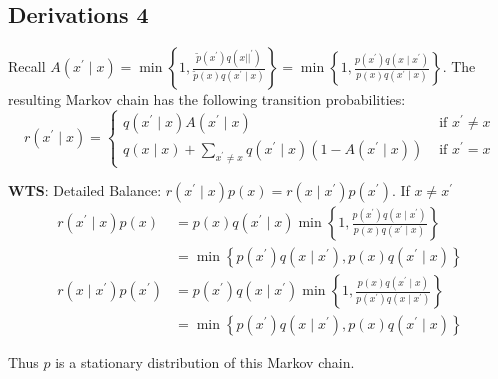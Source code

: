 \subsection{Derivations 4}
\label{sec:proof-metro}
Recall $A\left(x^{\prime} \mid x\right)=\min \left\{1, \frac{\tilde{p}\left(x^{\prime}\right) q\left(x||^{\prime}\right)}{\tilde{p}(x) q\left(x^{\prime} \mid x\right)}\right\}=\min \left\{1, \frac{p\left(x^{\prime}\right) q\left(x \mid x^{\prime}\right)}{p(x) q\left(x^{\prime} \mid x\right)}\right\}$.
The resulting Markov chain has the following transition probabilities:
$$
r\left(x^{\prime} \mid x\right)=\left\{\begin{array}{ll}
q\left(x^{\prime} \mid x\right) A\left(x^{\prime} \mid x\right) & \text { if } x^{\prime} \neq x \\
q(x \mid x)+\sum_{x^{\prime} \neq x} q\left(x^{\prime} \mid x\right)\left(1-A\left(x^{\prime} \mid x\right)\right) & \text { if } x^{\prime}=x
\end{array}\right.
$$

\textbf{WTS}: Detailed Balance: $r\left(x^{\prime} \mid x\right) p(x)=r\left(x \mid x^{\prime}\right) p\left(x^{\prime}\right)$. If $x \neq x^{\prime}$
\begin{align*}
    r\left(x^{\prime} \mid x\right) p(x)&=p(x) q\left(x^{\prime} \mid x\right) \min \left\{1, \frac{p\left(x^{\prime}\right) q\left(x \mid x^{\prime}\right)}{p(x) q\left(x^{\prime} \mid x\right)}\right\}\\
    &=\min \left\{p\left(x^{\prime}\right) q\left(x \mid x^{\prime}\right), p(x) q\left(x^{\prime} \mid x\right)\right\}\\
    r\left(x \mid x^{\prime}\right) p\left(x^{\prime}\right)&=p\left(x^{\prime}\right) q\left(x \mid x^{\prime}\right) \min \left\{1, \frac{p(x) q\left(x^{\prime} \mid x\right)}{p\left(x^{\prime}\right) q\left(x \mid x^{\prime}\right)}\right\}\\
    &=\min \left\{p\left(x^{\prime}\right) q\left(x \mid x^{\prime}\right), p(x) q\left(x^{\prime} \mid x\right)\right\}
\end{align*}

Thus $p$ is a stationary distribution of this Markov chain.